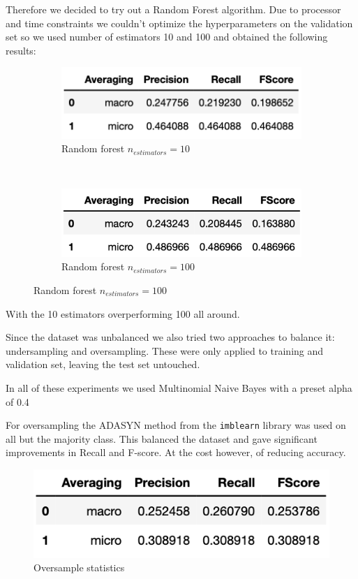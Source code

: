 \documentclass[11pt,a4paper]{article}
\begin{document}
Therefore we decided to try out a Random Forest algorithm. Due to processor and time constraints we couldn't optimize the hyperparameters on the validation set so we used number of estimators 10 and 100 and obtained the following results:
\begin{figure}[h!] %
	\begin{subfigure}[h!]{0.5\textwidth}
		\includegraphics[width=\linewidth]{forest10.png}
		\caption{Random forest $n_{estimators} = 10$}
		\label{fig:nb_val}
	\end{subfigure}
	~
	\begin{subfigure}[h!]{0.5\textwidth}
		\includegraphics[width=\linewidth]{forest100.png}
		\caption{Random forest $n_{estimators} = 100$}
		\label{fig:svm1_val}
	\end{subfigure}
\end{figure}


With the 10 estimators overperforming 100 all around.

Since the dataset was unbalanced we also tried two approaches to balance it: undersampling and oversampling. These were only applied to training and validation set, leaving the test set untouched.

In all of these experiments we used Multinomial Naive Bayes with a preset alpha of 0.4

For oversampling the ADASYN method from the \texttt{imblearn} library was used on all but the majority class. This balanced the dataset and gave significant improvements in Recall and F-score. At the cost however, of reducing accuracy. 
\begin{figure}[h!] %
	\center
	\includegraphics[scale=0.5]{oversample.png}
	\caption{Oversample statistics}
\end{figure}
\end{document}
